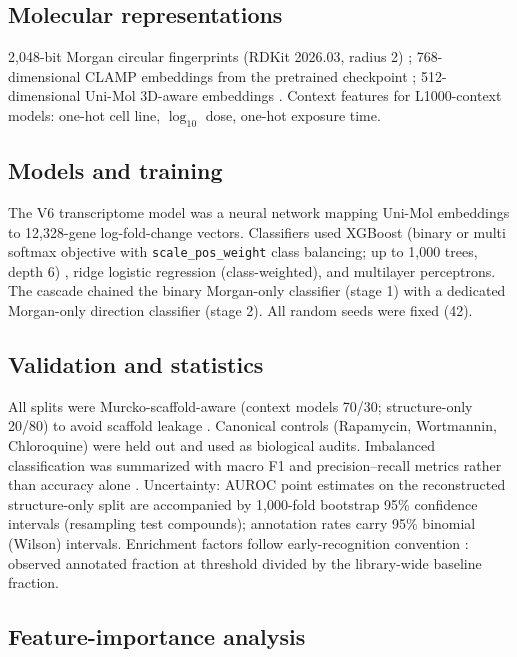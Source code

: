 \documentclass[11pt]{article}
\begin{document}
\subsection*{Molecular representations}

2{,}048-bit Morgan circular fingerprints (RDKit 2026.03, radius 2)
\cite{rogers2010,rdkit}; 768-dimensional CLAMP embeddings from the pretrained
checkpoint \cite{clamp}; 512-dimensional Uni-Mol 3D-aware embeddings
\cite{unimol}. Context features for L1000-context models: one-hot cell line,
$\log_{10}$ dose, one-hot exposure time.

\subsection*{Models and training}

The V6 transcriptome model was a neural network mapping Uni-Mol embeddings to
12{,}328-gene log-fold-change vectors. Classifiers used XGBoost (binary or
multi softmax objective with \texttt{scale\_pos\_weight} class balancing; up to
1{,}000 trees, depth 6) \cite{xgboost}, ridge logistic regression
(class-weighted), and multilayer perceptrons. The cascade chained the binary
Morgan-only classifier (stage 1) with a dedicated Morgan-only direction
classifier (stage 2). All random seeds were fixed (42).

\subsection*{Validation and statistics}

All splits were Murcko-scaffold-aware \cite{bemis1996,moleculenet} (context
models 70/30; structure-only 20/80) to avoid scaffold leakage
\cite{wallach2018}. Canonical controls (Rapamycin, Wortmannin, Chloroquine)
were held out and used as biological audits. Imbalanced classification was
summarized with macro F1 and precision--recall metrics rather than accuracy
alone \cite{saito2015}. Uncertainty: AUROC point estimates on the
reconstructed structure-only split are accompanied by 1{,}000-fold bootstrap
95\% confidence intervals (resampling test compounds); annotation rates carry
95\% binomial (Wilson) intervals. Enrichment factors follow early-recognition
convention \cite{truchon2007}: observed annotated fraction at threshold
divided by the library-wide baseline fraction.

\subsection*{Feature-importance analysis}
\end{document}
